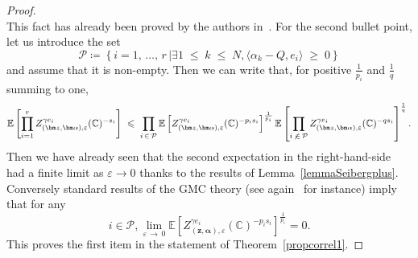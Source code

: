 \documentclass[AHL,Unicode,longabstracts,published]{cedram}
\renewcommand{\leq}{\;\leqslant\;}
\renewcommand{\geq}{\;\geqslant\;}
\newcommand{\clP}{\mathcal{P}}
\newcommand{\C}{\mathbb{C}}
\newcommand{\E}{\mathbb{E}}
\newcommand{\ps}[1]{\langle #1 \rangle}
\newcommand*\eps{\varepsilon}
\let\oldexists\exists
\renewcommand*{\exists}{\mathrel{\oldexists}}
\begin{document}
\begin{proof}
\[\]
This fact has already been proved by the authors in~\cite[Lemma~3.3]{DKRV}. For the second bullet point, let us introduce the set 
\[
\clP\coloneqq \left\{i=1,\,\dots,\,r\,\vert\exists1\leq k\leq N,\ps{\alpha_k-Q,e_i}\geq 0\right\}
\]
and assume that it is non-empty. Then we can write that, for positive $\frac 1{p_i}$ and $\frac 1q$ summing to one,
\[
\E \left[\prod_{i=1}^{r} Z_{(\bm z,\bm \alpha), \eps}^{\gamma e_i} (\C)^{- s_i} \right]\leq \prod_{i\,\in\,\clP}\E \left [Z_{\left(\bm z,\bm \alpha\right), \eps}^{\gamma e_i} (\C)^{- p_is_i} \right]^{\frac1{p_i}}\E \left[\prod_{i\,\not\,\in\,\clP} Z_{\left(\bm z,\bm \alpha\right), \eps}^{\gamma e_i} (\C)^{- qs_i} \right]^{\frac1q}.
\]
Then we have already seen that the second expectation in the right-hand-side had a finite limit as $\eps\rightarrow0$ thanks to the results of Lemma~\ref{lemmaSeibergplus}. Conversely standard results of the GMC theory (see again~\cite[Lemma~3.3]{DKRV} for instance) imply that for any 
\[
i\in\clP, {\lim\limits_{\eps\,\to\,0}\E \left[Z_{(\bm z,\bm \alpha), \eps}^{\gamma e_i} (\C)^{- p_is_i} \right]^{\frac1{p_i}}=0}.
\]
This proves the first item in the statement of Theorem~\ref{propcorrel1}.


\end{proof}
\end{document}

